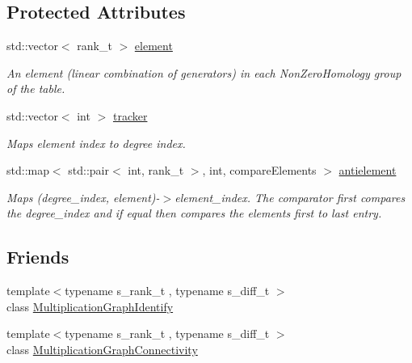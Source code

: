 \subsection*{Protected Attributes}
\begin{DoxyCompactItemize}
\item 
std\+::vector$<$ rank\+\_\+t $>$ \hyperlink{classMackey_1_1MultiplicationGraph_a53fe65317d8cef485a93e3e516dd374f}{element}
\begin{DoxyCompactList}\small\item\em An element (linear combination of generators) in each Non\+Zero\+Homology group of the table. \end{DoxyCompactList}\item 
std\+::vector$<$ int $>$ \hyperlink{classMackey_1_1MultiplicationGraph_ac831b81d1936c4dd2202dabaa8e4e2fb}{tracker}
\begin{DoxyCompactList}\small\item\em Maps element index to degree index. \end{DoxyCompactList}\item 
std\+::map$<$ std\+::pair$<$ int, rank\+\_\+t $>$, int, compare\+Elements $>$ \hyperlink{classMackey_1_1MultiplicationGraph_a8a0d1354d01f29d4388142aab0248389}{antielement}
\begin{DoxyCompactList}\small\item\em Maps (degree\+\_\+index, element)-\/$>$element\+\_\+index. The comparator first compares the degree\+\_\+index and if equal then compares the elements first to last entry. \end{DoxyCompactList}\end{DoxyCompactItemize}
\subsection*{Friends}
\begin{DoxyCompactItemize}
\item 
{\footnotesize template$<$typename s\+\_\+rank\+\_\+t , typename s\+\_\+diff\+\_\+t $>$ }\\class \hyperlink{classMackey_1_1MultiplicationGraph_a3c44ae70fe9249e9662ab525f97dc1db}{Multiplication\+Graph\+Identify}
\item 
{\footnotesize template$<$typename s\+\_\+rank\+\_\+t , typename s\+\_\+diff\+\_\+t $>$ }\\class \hyperlink{classMackey_1_1MultiplicationGraph_a332842acf3d2d77031c64152ef5e08fc}{Multiplication\+Graph\+Connectivity}
\end{DoxyCompactItemize}


